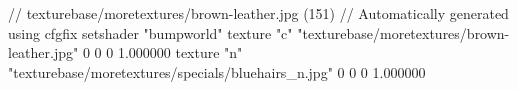 // texturebase/moretextures/brown-leather.jpg (151)
// Automatically generated using cfgfix
setshader "bumpworld"
texture "c" "texturebase/moretextures/brown-leather.jpg" 0 0 0 1.000000
texture "n" "texturebase/moretextures/specials/bluehairs_n.jpg" 0 0 0 1.000000
